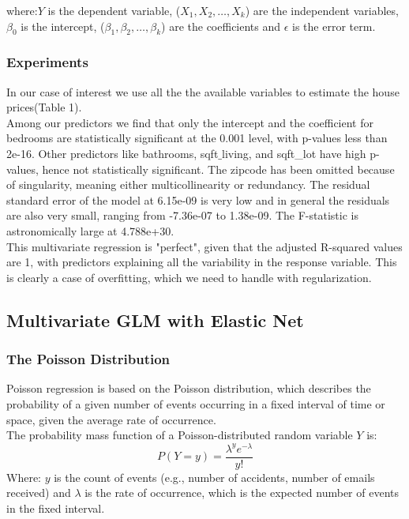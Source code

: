 \documentclass[a4paper, 9pt]{article}
\begin{document}
\begin{multicols}{2}
where:$Y$ is the dependent variable, ($X_1, X_2,\dots,X_k$) are the independent variables, $\beta_0$ is the intercept, ($\beta_1,\beta_2, \dots, \beta_k$) are the coefficients and $\epsilon$ is the error term.\\
\subsubsection*{Experiments}
In our case of interest we use all the the available variables to estimate the house prices(Table 1).\\
Among our predictors we find that only the intercept and the coefficient for bedrooms are statistically significant at the 0.001 level, with p-values less than 2e-16. Other predictors like bathrooms, sqft$\_$living, and sqft{\_}lot have high p-values, hence not statistically significant. The zipcode has been omitted because of singularity, meaning either multicollinearity or redundancy. The residual standard error of the model at 6.15e-09 is very low and in general the residuals are also very small, ranging from -7.36e-07 to 1.38e-09. The F-statistic is astronomically large at 4.788e+30.\\
This multivariate regression is "perfect", given that the adjusted R-squared values are 1, with predictors explaining all the variability in the response variable. This is clearly a case of overfitting, which we need to handle with regularization.


\subsection{Multivariate GLM with Elastic Net} \vspace{-3pt}
\subsubsection*{The Poisson Distribution}
Poisson regression is based on the Poisson distribution, which describes the probability of a given number of events occurring in a fixed interval of time or space, given the average rate of occurrence.\\
The probability mass function of a Poisson-distributed random variable $Y$ is:
\begin{equation}
P(Y=y)= \frac{\lambda^ye^{-\lambda}}{y!}
\end{equation}
Where: $y$ is the count of events (e.g., number of accidents, number of emails received) and $\lambda$ is the rate of occurrence, which is the expected number of events in the fixed interval.

\end{multicols}
\end{document}
